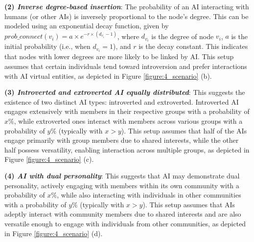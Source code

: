 \noindent \textbf{(2) \textit{Inverse degree-based insertion}}: The probability of an AI interacting with humans (or other AIs) is inversely proportional to the node's degree. This can be modeled using an exponential decay function, given by ${prob\_connect}(v_i) = a \times e^{-r \times (d_{v_i} - 1)}$, where $d_{v_i}$ is the degree of node $v_i$, $a$ is the initial probability (i.e., when $d_{v_i}=1$), and $r$ is the decay constant. This indicates that nodes with lower degrees are more likely to be linked by AI. This setup assumes that certain individuals tend toward introversion and prefer interactions with AI virtual entities, as depicted in Figure \ref{figure:4_scenario} (b).

\noindent \textbf{(3) \textit{Introverted and extroverted AI equally distributed}}: This suggests the existence of two distinct AI types: introverted and extroverted. Introverted AI engages extensively with members in their respective groups with a probability of $x\%$, while extroverted ones interact with members across various groups with a probability of $y\%$ (typically with $x>y$). This setup assumes that half of the AIs engage primarily with group members due to shared interests, while the other half possess versatility, enabling interaction across multiple groups, as depicted in Figure \ref{figure:4_scenario} (c).

\noindent \textbf{(4) \textit{AI with dual personality}}: This suggests that AI may demonstrate dual personality, actively engaging with members within its own community with a probability of $x\%$, while also interacting with individuals in other communities with a probability of $y\%$ (typically with $x>y$). This setup assumes that AIs adeptly interact with community members due to shared interests and are also versatile enough to engage with individuals from other communities, as depicted in Figure \ref{figure:4_scenario} (d).

